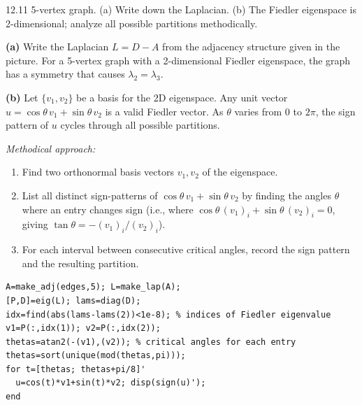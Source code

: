 \begin{exercise}{12.11}
5-vertex graph. (a) Write down the Laplacian. (b) The Fiedler eigenspace is 2-dimensional; analyze all possible partitions methodically.
\end{exercise}
\begin{solution}
\textbf{(a)} Write the Laplacian $L=D-A$ from the adjacency structure given in the picture. For a 5-vertex graph with a 2-dimensional Fiedler eigenspace, the graph has a symmetry that causes $\lambda_2=\lambda_3$.

\textbf{(b)} Let $\{v_1,v_2\}$ be a basis for the 2D eigenspace. Any unit vector $u=\cos\theta\,v_1+\sin\theta\,v_2$ is a valid Fiedler vector. As $\theta$ varies from 0 to $2\pi$, the sign pattern of $u$ cycles through all possible partitions.

\textit{Methodical approach:}
\begin{enumerate}[label=\arabic*.]
  \item Find two orthonormal basis vectors $v_1,v_2$ of the eigenspace.
  \item List all distinct sign-patterns of $\cos\theta\,v_1+\sin\theta\,v_2$ by finding the angles $\theta$ where an entry changes sign (i.e., where $\cos\theta\,(v_1)_i+\sin\theta\,(v_2)_i=0$, giving $\tan\theta=-(v_1)_i/(v_2)_i$).
  \item For each interval between consecutive critical angles, record the sign pattern and the resulting partition.
\end{enumerate}
\begin{lstlisting}
A=make_adj(edges,5); L=make_lap(A);
[P,D]=eig(L); lams=diag(D);
idx=find(abs(lams-lams(2))<1e-8); % indices of Fiedler eigenvalue
v1=P(:,idx(1)); v2=P(:,idx(2));
thetas=atan2(-(v1),(v2)); % critical angles for each entry
thetas=sort(unique(mod(thetas,pi)));
for t=[thetas; thetas+pi/8]'
  u=cos(t)*v1+sin(t)*v2; disp(sign(u)');
end
\end{lstlisting}
\end{solution}

